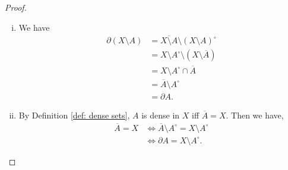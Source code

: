 \begin{proposition}
\begin{proof}
\begin{enumerate}[(i)]
			\item
			We have
			$$
			\begin{aligned}
				\partial (X \setminus A) &= \overline{X \setminus A} \setminus (X \setminus A)^\circ \\
				&= X \setminus A^\circ \setminus (X \setminus \overline A) \\
				&= X \setminus A^\circ \cap \overline A \\
				&= \overline A \setminus A^\circ \\
				&= \partial A.
			\end{aligned}
			$$
			
			\item
			By Definition \ref{def: dense sets}, $A$ is dense  in $X$ iff $\overline A = X$. Then we have,
			$$
			\begin{aligned}
				\overline A = X &\iff \overline A \setminus A^\circ = X \setminus A^\circ \\
				&\iff \partial A = X \setminus A^\circ.
			\end{aligned}
			$$
		\end{enumerate}
	\end{proof}
\end{proposition}

